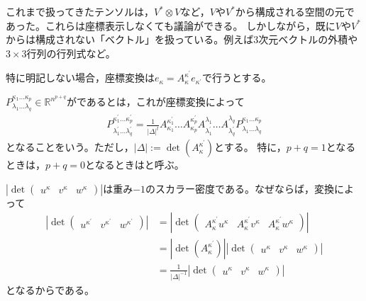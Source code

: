 \documentclass[uplatex]{jsarticle}
\begin{document}
\sukima{}\par
これまで扱ってきたテンソルは，$V^{*} \otimes V$など，$V$や$V^{*}$から構成される空間の元であった。これらは座標表示しなくても議論ができる。
しかしながら，既に$V$や$V^{*}$からは構成されない「ベクトル」を扱っている。例えば3次元ベクトルの外積や$3 \times 3$行列の行列式など。

特に明記しない場合，座標変換は$e_{\kappa} = A_{\kappa}^{\kappa^{\prime}}e_{\kappa^{\prime}}$で行うとする。

\begin{teigi}[テンソル密度]
  $P^{\kappa_{1}\dots\kappa_{p}}_{\lambda_{1}\dots\lambda_{q}} \in \mathbb{R}^{n^{p+q}}$がであるとは，これが座標変換によって
  \begin{align}
    P^{\kappa^{\prime}_{1}\dots\kappa^{\prime}_{p}}_{\lambda^{\prime}_{1}\dots\lambda^{\prime}_{q}} = \frac{1}{\left|\Delta\right|^{t}} A^{\kappa^{\prime}_{1}}_{\kappa_{1}} \dots A^{\kappa^{\prime}_{p}}_{\kappa_{p}} A_{\lambda^{\prime}_{1}}^{\lambda_{1}} \dots A_{\lambda^{\prime}_{q}}^{\lambda_{q}} P^{\kappa_{1}\dots\kappa_{p}}_{\lambda_{1}\dots\lambda_{q}}
  \end{align}
  となることをいう。ただし，$\left|\Delta\right| := \det (A^{\kappa^{\prime}}_{\kappa})$とする。
  特に，$p+q=1$となるときは，$p+q=0$となるときはと呼ぶ。
\end{teigi}

\begin{rei}
  $\left| \det \begin{pmatrix} u^{\kappa} & v^{\kappa} & w^{\kappa} \end{pmatrix} \right|$は重み$-1$のスカラー密度である。なぜならば，変換によって
  \begin{align*}
    \left| \det \begin{pmatrix} u^{\kappa^{\prime}} & v^{\kappa^{\prime}} & w^{\kappa^{\prime}} \end{pmatrix} \right| &= \left| \det \begin{pmatrix} A_{\kappa}^{\kappa^{\prime}} u^{\kappa} & A_{\kappa}^{\kappa^{\prime}} v^{\kappa} & A_{\kappa}^{\kappa^{\prime}} w^{\kappa} \end{pmatrix} \right| \\
    &= \left| \det (A_{\kappa}^{\kappa^{\prime}}) \right| \left| \det \begin{pmatrix} u^{\kappa} & v^{\kappa} & w^{\kappa} \end{pmatrix} \right| \\
    &= \frac{1}{\left| \Delta \right|^{-1}} \left| \det \begin{pmatrix} u^{\kappa} & v^{\kappa} & w^{\kappa} \end{pmatrix} \right|
  \end{align*}
  となるからである。
\end{rei}
\end{document}
